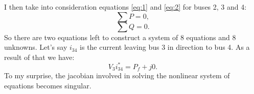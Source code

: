 \documentclass[11pt]{article}
\begin{document}
I then take into consideration equations \ref{eq:1} and \ref{eq:2} for buses 2, 3 and 4:
\begin{equation}
    \sum P = 0,
    \label{eq:1}
\end{equation}
\begin{equation}
    \sum Q = 0.
    \label{eq:2}
\end{equation}
So there are two equations left to construct a system of 8 equations and 8 unknowns. Let's say $i_{34}$ is the current leaving bus 3 in direction to bus 4. As a result of that we have:
\begin{equation}
    V_3i^*_{34} = P_f + j0.
\end{equation}
To my surprise, the jacobian involved in solving the nonlinear system of equations becomes singular. 
\end{document}
